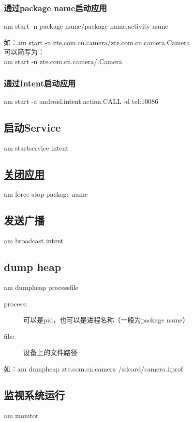 ﻿\documentclass[a4paper,11pt]{article}
\begin{document}
  \subsubsection[通过package name启动应用]{通过package name启动应用}
  am start -n \lt package-name\gt/\lt package-name.activity-name\gt

  如：am start -n zte.com.cn.camera/zte.com.cn.camera.Camera\\
  可以简写为：\\
  am start -n zte.com.cn.camera/.Camera

  \subsubsection[通过Intent启动应用]{通过Intent启动应用}
  am start -a android.intent.action.CALL -d tel:10086

  \subsection[启动Service]{启动Service}
  am startservice \lt intent\gt

  \subsection[关闭应用]{\underline{关闭应用}}
  am force-stop \lt package-name\gt

  \subsection[发送广播]{发送广播}
  am broadcast \lt intent\gt

  \subsection[dump heap]{dump heap}
  am dumpheap \lt process\gt \lt file\gt

  \begin{description}
    \item[process:] 可以是pid，也可以是进程名称（一般为package name）
    \item[file:] 设备上的文件路径
  \end{description}
  如：am dumpheap zte.com.cn.camera /sdcard/camera.hprof

  \subsection[监视系统运行]{监视系统运行}
  am monitor
\end{document}
